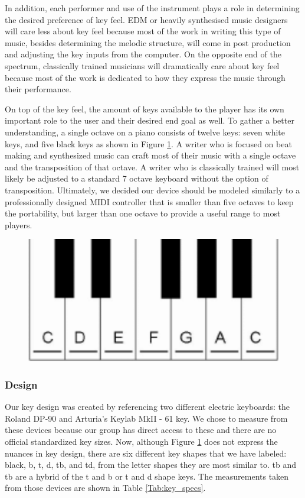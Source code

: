 In addition, each performer and use of the instrument plays a role in determining the desired preference of key feel. EDM or heavily synthesised music designers will care less about key feel because most of the work in writing this type of music, besides determining the melodic structure, will come in post production and adjusting the key inputs from the computer. On the opposite end of the spectrum, classically trained musicians will dramatically care about key feel because most of the work is dedicated to how they express the music through their performance.

On top of the key feel, the amount of keys available to the player has its own important role to the user and their desired end goal as well. To gather a better understanding, a single octave on a piano consists of twelve keys: seven white keys, and five black keys as shown in Figure \ref{fig:octave}. A writer who is focused on beat making and synthesized music can craft most of their music with a single octave and the transposition of that octave. A writer who is classically trained will most likely be adjusted to a standard 7 octave keyboard without the option of transposition. Ultimately, we decided our device should be modeled similarly to a professionally designed MIDI controller that is smaller than five octaves to keep the portability, but larger than one octave to provide a useful range to most players.

\begin{figure}[h!]
  \centering
  \includegraphics[width=0.5\linewidth]{image/Octave.png}
  \caption{}
  \label{fig:octave}
\end{figure}

\subsubsection{Design}
Our key design was created by referencing two different electric keyboards: the Roland DP-90 and Arturia’s Keylab MkII - 61 key. We chose to measure from these devices because our group has direct access to these and there are no official standardized key sizes. Now, although Figure \ref{fig:octave} does not express the nuances in key design, there are six different key shapes that we have labeled: black, b, t, d, tb, and td, from the letter shapes they are most similar to. tb and tb are a hybrid of the t and b or t and d shape keys. The measurements taken from those devices are shown in Table \ref{Tab:key_specs}.

